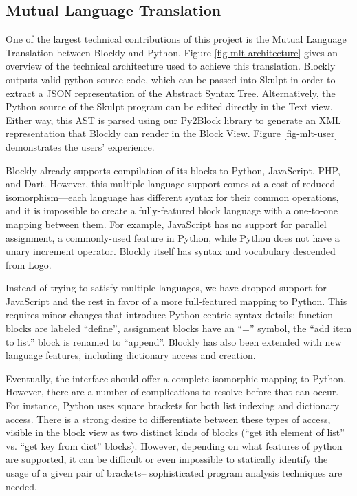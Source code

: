 \documentclass{sig-alternate}
\begin{document}
\subsection{Mutual Language Translation}

One of the largest technical contributions of this project is the Mutual Language Translation between Blockly and Python.
Figure \ref{fig-mlt-architecture} gives an overview of the technical architecture used to achieve this translation.
Blockly outputs valid python source code, which can be passed into Skulpt in order to extract a JSON representation of the Abstract Syntax Tree.
Alternatively, the Python source of the Skulpt program can be edited directly in the Text view. 
Either way, this AST is parsed using our Py2Block library to generate an XML representation that Blockly can render in the Block View.
Figure \ref{fig-mlt-user} demonstrates the users' experience.

Blockly already supports compilation of its blocks to Python, JavaScript, PHP, and Dart.
However, this multiple language support comes at a cost of reduced isomorphism---each language has different syntax for their common operations, and it is impossible to create a fully-featured block language with a one-to-one mapping between them.
For example, JavaScript has no support for parallel assignment, a commonly-used feature in Python, while Python does not have a unary increment operator.
Blockly itself has syntax and vocabulary descended from Logo.

Instead of trying to satisfy multiple languages, we have dropped support for JavaScript and the rest in favor of a more full-featured mapping to Python.
This requires minor changes that introduce Python-centric syntax details:
function blocks are labeled ``define'', assignment blocks have an ``='' symbol, the ``add item to list'' block is renamed to ``append''.
Blockly has also been extended with new language features, including dictionary access and creation.

Eventually, the interface should offer a complete isomorphic mapping to Python.
However, there are a number of complications to resolve before that can occur.
For instance, Python uses square brackets for both list indexing and dictionary access.
There is a strong desire to differentiate between these types of access, visible in the block view as two distinct kinds of blocks (``get ith element of list'' vs. ``get key from dict'' blocks).
However, depending on what features of python are supported, it can be difficult or even impossible to statically identify the usage of a given pair of brackets-- sophisticated program analysis techniques are needed.
\end{document}

